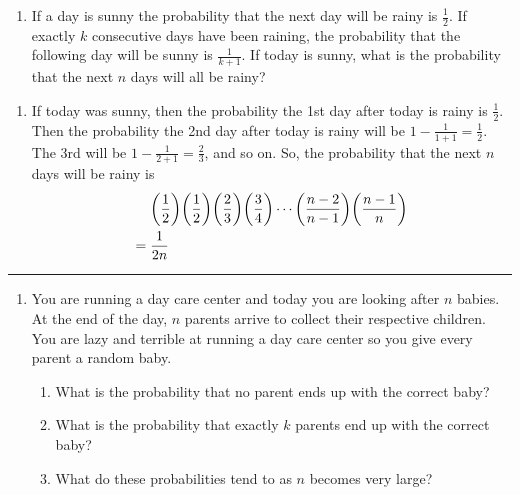 \documentclass{article}
\DeclarePairedDelimiter{\paren}{(}{)}
\newenvironment{problem}[1]    %
{
	\begin{enumerate}[leftmargin = 0in]
		\item[\bfseries{#1}]
}
{	\end{enumerate}
}
\newenvironment{multipart}
{
	\begin{enumerate}[leftmargin = *, align = left, label = {\alph*.}, topsep = 0pt]
}	
{
	\end{enumerate}
}
\newenvironment{solution}    %
{
	\begin{enumerate}[leftmargin = 0in]
		\item[\bfseries{Solution}]
}
{
	\end{enumerate}
}
\begin{document}
	\begin{problem}{4}
		If a day is sunny the probability that the next day will be rainy is $\frac{1}{2}$. If exactly $k$ consecutive days have been raining, the probability that the following day will be sunny is $\frac{1}{k + 1}$. If today is sunny, what is the probability that the next $n$ days will all be rainy?
	\end{problem}
	
	\begin{solution}
		If today was sunny, then the probability the 1st day after today is rainy is $\frac{1}{2}$. Then the probability the 2nd day after today is rainy will be $1 - \frac{1}{1 + 1} = \frac{1}{2}$. The 3rd will be $1 - \frac{1}{2 + 1} = \frac{2}{3}$, and so on. So, the probability that the next $n$ days will be rainy is
		\begin{align*}
			&\paren[\bigg]{\frac{1}{2}} \paren[\bigg]{\frac{1}{2}} \paren[\bigg]{\frac{2}{3}} \paren[\bigg]{\frac{3}{4}} \cdots \paren[\bigg]{\frac{n - 2}{n - 1}}\paren[\bigg]{\frac{n - 1}{n}} \\
			={}& \frac{1}{2n}
		\end{align*}
	\end{solution}
	
\hrule %

	\begin{problem}{6}
		You are running a day care center and today you are looking after $n$ babies. At the end of the day, $n$ parents arrive to collect their respective children. You are lazy and terrible at running a day care center so you give every parent a random baby.
		\begin{multipart}
			\item What is the probability that no parent ends up with the correct baby?
			\item What is the probability that exactly $k$ parents end up with the correct baby?
			\item What do these probabilities tend to as $n$ becomes very large?
		\end{multipart}

	\end{problem}
\end{document}
